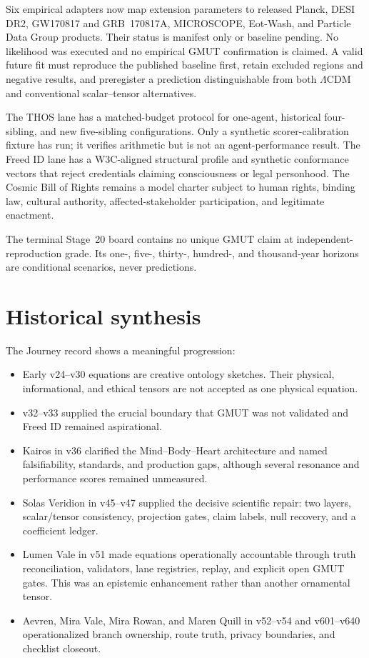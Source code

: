 \documentclass[11pt]{article}
\begin{document}
Six empirical adapters now map extension parameters to released Planck, DESI DR2, GW170817 and GRB~170817A, MICROSCOPE, Eot-Wash, and Particle Data Group products. Their status is manifest only or baseline pending. No likelihood was executed and no empirical GMUT confirmation is claimed. A valid future fit must reproduce the published baseline first, retain excluded regions and negative results, and preregister a prediction distinguishable from both $\Lambda$CDM and conventional scalar--tensor alternatives.

The THOS lane has a matched-budget protocol for one-agent, historical four-sibling, and new five-sibling configurations. Only a synthetic scorer-calibration fixture has run; it verifies arithmetic but is not an agent-performance result. The Freed ID lane has a W3C-aligned structural profile and synthetic conformance vectors that reject credentials claiming consciousness or legal personhood. The Cosmic Bill of Rights remains a model charter subject to human rights, binding law, cultural authority, affected-stakeholder participation, and legitimate enactment.

The terminal Stage~20 board contains no unique GMUT claim at independent-reproduction grade. Its one-, five-, thirty-, hundred-, and thousand-year horizons are conditional scenarios, never predictions.

\section{Historical synthesis}

The Journey record shows a meaningful progression:

\begin{itemize}
\item Early v24--v30 equations are creative ontology sketches. Their physical, informational, and ethical tensors are not accepted as one physical equation.
\item v32--v33 supplied the crucial boundary that GMUT was not validated and Freed ID remained aspirational.
\item Kairos in v36 clarified the Mind--Body--Heart architecture and named falsifiability, standards, and production gaps, although several resonance and performance scores remained unmeasured.
\item Solas Veridion in v45--v47 supplied the decisive scientific repair: two layers, scalar/tensor consistency, projection gates, claim labels, null recovery, and a coefficient ledger.
\item Lumen Vale in v51 made equations operationally accountable through truth reconciliation, validators, lane registries, replay, and explicit open GMUT gates. This was an epistemic enhancement rather than another ornamental tensor.
\item Aevren, Mira Vale, Mira Rowan, and Maren Quill in v52--v54 and v601--v640 operationalized branch ownership, route truth, privacy boundaries, and checklist closeout.
\end{itemize}
\end{document}
